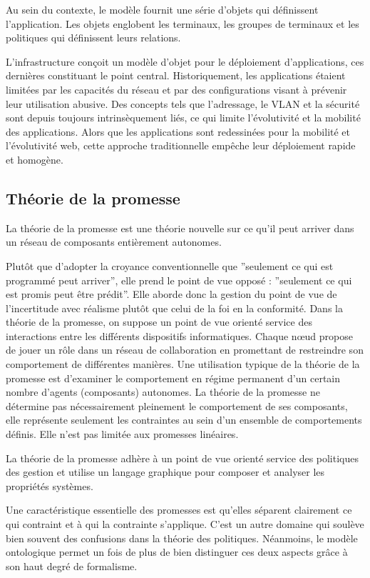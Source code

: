 Au sein du contexte, le modèle fournit une série d'objets qui définissent
l'application. Les objets englobent les terminaux, les groupes de terminaux et
les politiques qui définissent leurs relations.

L'infrastructure conçoit un modèle d'objet pour le déploiement d'applications,
ces dernières constituant le point central. Historiquement, les applications
étaient limitées par les capacités du réseau et par des configurations visant à
prévenir leur utilisation abusive. Des concepts tels que l'adressage, le VLAN et
la sécurité sont depuis toujours intrinsèquement liés, ce qui limite
l'évolutivité et la mobilité des applications. Alors que les applications sont
redessinées pour la mobilité et l'évolutivité web, cette approche traditionnelle
empêche leur déploiement rapide et homogène.

\subsection{Théorie de la promesse}

La théorie de la promesse est une théorie nouvelle sur ce qu'il peut arriver
dans un réseau de composants entièrement autonomes.

Plutôt que d'adopter la croyance conventionnelle que ''seulement ce qui est
programmé peut arriver'', elle prend le point de vue opposé : ''seulement ce
qui est promis peut être prédit''. Elle aborde donc la gestion du point de vue
de l'incertitude avec réalisme plutôt que celui de la foi en la conformité. Dans
la théorie de la promesse, on suppose un point de vue orienté service des
interactions entre les différents dispositifs informatiques. Chaque nœud propose
de jouer un rôle dans un réseau de collaboration en promettant de restreindre
son comportement de différentes manières. Une utilisation typique de la théorie
de la promesse est d'examiner le comportement en régime permanent d'un certain
nombre d'agents (composants) autonomes. La théorie de la promesse ne détermine
pas nécessairement pleinement le comportement de ses composants, elle représente
seulement les contraintes au sein d'un ensemble de comportements définis. Elle
n'est pas limitée aux promesses linéaires.

La théorie de la promesse adhère à un point de vue orienté service des
politiques des gestion et utilise un langage graphique pour composer et analyser
les propriétés systèmes.

Une caractéristique essentielle des promesses est qu'elles séparent clairement
ce qui contraint et à qui la contrainte s'applique. C'est un autre domaine qui
soulève bien souvent des confusions dans la théorie des politiques. Néanmoins,
le modèle ontologique permet un fois de plus de bien distinguer ces deux
aspects grâce à son haut degré de formalisme.

